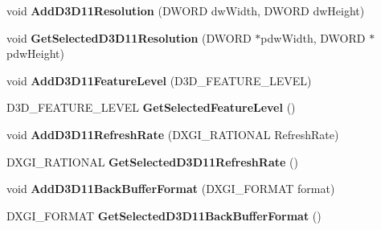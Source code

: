 \begin{DoxyCompactItemize}
\item 
\hypertarget{class_c_d3_d_settings_dlg_a080ed8d60c78110b8023a98eff7a0eb9}{void {\bfseries Add\+D3\+D11\+Resolution} (D\+W\+O\+R\+D dw\+Width, D\+W\+O\+R\+D dw\+Height)}\label{class_c_d3_d_settings_dlg_a080ed8d60c78110b8023a98eff7a0eb9}

\item 
\hypertarget{class_c_d3_d_settings_dlg_a6605a18c2d2dddc86a455e6ea5ee62ca}{void {\bfseries Get\+Selected\+D3\+D11\+Resolution} (D\+W\+O\+R\+D $\ast$pdw\+Width, D\+W\+O\+R\+D $\ast$pdw\+Height)}\label{class_c_d3_d_settings_dlg_a6605a18c2d2dddc86a455e6ea5ee62ca}

\item 
\hypertarget{class_c_d3_d_settings_dlg_a3fe8eb29a0d5382f3ec92f32766c78fd}{void {\bfseries Add\+D3\+D11\+Feature\+Level} (D3\+D\+\_\+\+F\+E\+A\+T\+U\+R\+E\+\_\+\+L\+E\+V\+E\+L)}\label{class_c_d3_d_settings_dlg_a3fe8eb29a0d5382f3ec92f32766c78fd}

\item 
\hypertarget{class_c_d3_d_settings_dlg_a5759de107ec5d77248adc6cd0047026b}{D3\+D\+\_\+\+F\+E\+A\+T\+U\+R\+E\+\_\+\+L\+E\+V\+E\+L {\bfseries Get\+Selected\+Feature\+Level} ()}\label{class_c_d3_d_settings_dlg_a5759de107ec5d77248adc6cd0047026b}

\item 
\hypertarget{class_c_d3_d_settings_dlg_a33dcb550e2368db83488b1d760869d9a}{void {\bfseries Add\+D3\+D11\+Refresh\+Rate} (D\+X\+G\+I\+\_\+\+R\+A\+T\+I\+O\+N\+A\+L Refresh\+Rate)}\label{class_c_d3_d_settings_dlg_a33dcb550e2368db83488b1d760869d9a}

\item 
\hypertarget{class_c_d3_d_settings_dlg_a1ef87313f3bab1755d2427ddc7763939}{D\+X\+G\+I\+\_\+\+R\+A\+T\+I\+O\+N\+A\+L {\bfseries Get\+Selected\+D3\+D11\+Refresh\+Rate} ()}\label{class_c_d3_d_settings_dlg_a1ef87313f3bab1755d2427ddc7763939}

\item 
\hypertarget{class_c_d3_d_settings_dlg_a7df2c621a6a22c7a8c1ff267d74f0361}{void {\bfseries Add\+D3\+D11\+Back\+Buffer\+Format} (D\+X\+G\+I\+\_\+\+F\+O\+R\+M\+A\+T format)}\label{class_c_d3_d_settings_dlg_a7df2c621a6a22c7a8c1ff267d74f0361}

\item 
\hypertarget{class_c_d3_d_settings_dlg_a7e59a7d81957585dce8b3f2870f77b52}{D\+X\+G\+I\+\_\+\+F\+O\+R\+M\+A\+T {\bfseries Get\+Selected\+D3\+D11\+Back\+Buffer\+Format} ()}\label{class_c_d3_d_settings_dlg_a7e59a7d81957585dce8b3f2870f77b52}


\end{DoxyCompactItemize}
